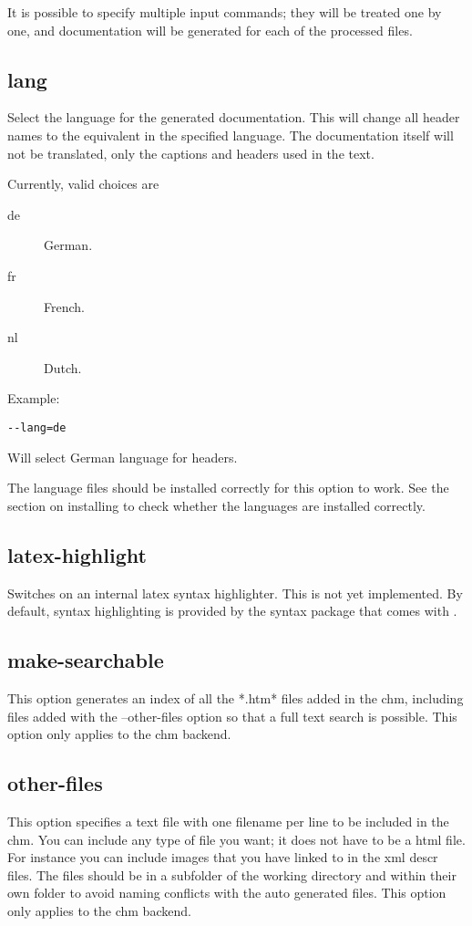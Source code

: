 It is possible to specify multiple input commands; they will be treated one
by one, and documentation will be generated for each of the processed files.

\subsection{lang}
\label{suse:lang}
Select the language for the generated documentation. This will change all
header names to the equivalent in the specified language. The documentation
itself will not be translated, only the captions and headers used in the
text.

Currently, valid choices are
\begin{description}
\item[de] German.
\item[fr] French.
\item[nl] Dutch.
\end{description}

Example:
\begin{verbatim}
--lang=de
\end{verbatim}
Will select German language for headers.

The language files should be installed correctly for this option to work.
See the section on installing to check whether the languages are installed
correctly.

\subsection{latex-highlight}
\label{suse:latexhighlight}
Switches on an internal latex syntax highlighter. This is not yet
implemented. By default, syntax highlighting is provided by the syntax
package that comes with \fpc.

\subsection{make-searchable}
This option generates an index of all the *.htm* files added in the chm, 
including files added with the --other-files option so that a full text search
is possible. This option only applies to the chm backend.

\subsection{other-files}
\label{suse:other-files}
This option specifies a text file with one filename per line to be included in
the chm. You can include any type of file you want; it does not have to be a
html file. For instance you can include images that you have linked to in the
xml descr files. The files should be in a subfolder of the working directory 
and within their own folder to avoid naming conflicts with the auto generated
files. This option only applies to the chm backend.

